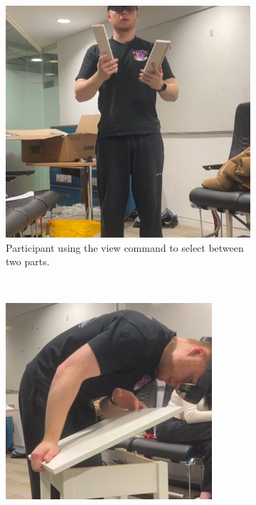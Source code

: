 \documentclass{l4proj}
\begin{document}
\begin{figure}[hbt!]
    \centering
    \begin{subfigure}[b]{0.45\textwidth}
        \includegraphics[width=\textwidth]{dissertation/images/expView.JPG}
        \caption{Participant using the view command to select between two parts.}
        \label{fig:expView}
    \end{subfigure}
    ~ %
    \begin{subfigure}[b]{0.45\textwidth}
        \includegraphics[width=\textwidth]{dissertation/images/expTop.JPG}

\end{subfigure}
\end{figure}
\end{document}
